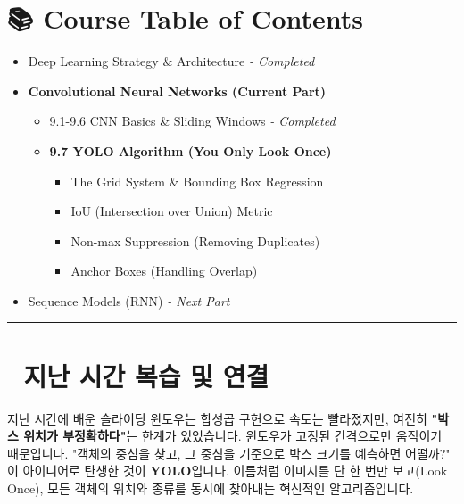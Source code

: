 \documentclass[11pt,a4paper]{book}
\theoremstyle{definition}
\begin{document}
\section*{📚 Course Table of Contents}
\begin{itemize}
    \item[Chapter 1-8.] Deep Learning Strategy \& Architecture \textit{- Completed}
    \item[\textbf{Chapter 9.}] \textbf{Convolutional Neural Networks (Current Part)}
    \begin{itemize}
        \item 9.1-9.6 CNN Basics \& Sliding Windows \textit{- Completed}
        \item \textbf{9.7 YOLO Algorithm (You Only Look Once)}
        \begin{itemize}
            \item The Grid System \& Bounding Box Regression
            \item IoU (Intersection over Union) Metric
            \item Non-max Suppression (Removing Duplicates)
            \item Anchor Boxes (Handling Overlap)
        \end{itemize}
    \end{itemize}
    \item[Chapter 10.] Sequence Models (RNN) \textit{- Next Part}
\end{itemize}

\vspace{0.5cm}
\hrule
\vspace{0.5cm}

\section*{🔗 지난 시간 복습 및 연결}
지난 시간에 배운 슬라이딩 윈도우는 합성곱 구현으로 속도는 빨라졌지만, 여전히 \textbf{"박스 위치가 부정확하다"}는 한계가 있었습니다. 윈도우가 고정된 간격으로만 움직이기 때문입니다.
"객체의 중심을 찾고, 그 중심을 기준으로 박스 크기를 예측하면 어떨까?"
이 아이디어로 탄생한 것이 \textbf{YOLO}입니다. 이름처럼 이미지를 단 한 번만 보고(Look Once), 모든 객체의 위치와 종류를 동시에 찾아내는 혁신적인 알고리즘입니다.

\end{document}
